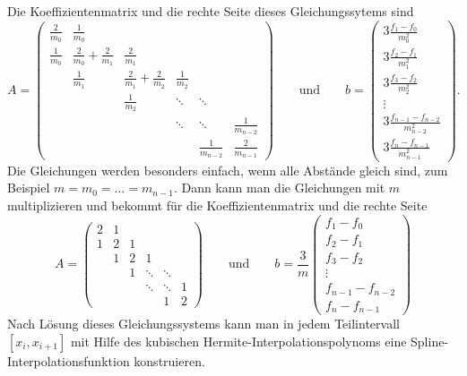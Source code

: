 Die Koeffizientenmatrix und die rechte Seite dieses Gleichungssytems sind
\[
A
=
\begin{pmatrix}
\displaystyle\frac{2}{m_0}
	&\displaystyle\frac{1}{m_0}
		&
			&
				&
					&
\\[8pt]
\displaystyle\frac{1}{m_0}
	&\displaystyle\frac{2}{m_0}+\frac{2}{m_1}
		&\displaystyle\frac{2}{m_1}
			&
				&
					&
\\[8pt]
	&\displaystyle\frac{1}{m_1}
		&\displaystyle\frac{2}{m_1}+\frac{2}{m_2}
			&\displaystyle\frac{1}{m_2}
				&
					&
\\[8pt]
	&
		&\displaystyle\frac{1}{m_2}
			&\ddots
				&\ddots
					&
\\[8pt]
	&
		&
			&\ddots
				&\ddots
					&\displaystyle\frac{1}{m_{n-2}}
\\[8pt]
	&
		&
			&
				&\displaystyle\frac{1}{m_{n-2}}
					&\displaystyle\frac{2}{m_{n-1}}
\end{pmatrix}
\qquad\text{und}\qquad
b
=
\begin{pmatrix}
\displaystyle3\frac{f_1-f_0}{m_0^2} \\[8pt]
\displaystyle3\frac{f_2-f_1}{m_1^2} \\[8pt]
\displaystyle3\frac{f_3-f_2}{m_2^2} \\[8pt]
\vdots \\[8pt]
\displaystyle3\frac{f_{n-1}-f_{n-2}}{m_{n-2}^2} \\[8pt]
\displaystyle3\frac{f_n-f_{n-1}}{m_{n-1}^2} 
\end{pmatrix}.
\]
Die Gleichungen werden besonders einfach, wenn alle Abstände gleich sind,
zum Beispiel $m=m_0=\dots =m_{n-1}$.
Dann kann man die Gleichungen mit $m$ multiplizieren und bekommt für die
Koeffizientenmatrix und die rechte Seite
\[
A
=
\begin{pmatrix}
2&1& &      &      & \\
1&2&1&      &      & \\
 &1&2&1     &      & \\
 & &1&\ddots&\ddots& \\
 & & &\ddots&\ddots&1\\
 & & &      &     1&2
\end{pmatrix}
\qquad\text{und}\qquad
b
=
\frac{3}{m}
\begin{pmatrix}
f_1-f_0\\
f_2-f_1\\
f_3-f_2\\
\vdots\\
f_{n-1}-f_{n-2}\\
f_n-f_{n-1}
\end{pmatrix}
\]
Nach Lösung dieses Gleichungssystems kann man in jedem Teilintervall
$[x_i,x_{i+1}]$ mit Hilfe des kubischen Hermite-Interpolationspolynoms
eine Spline-Interpolationsfunktion konstruieren.
%
%


